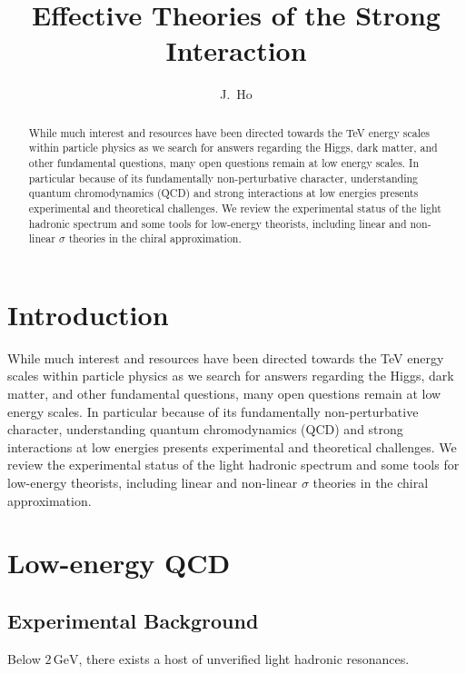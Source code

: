\documentclass[aps,prd,onecolumn,showpacs,amsmath,amssymb,nofootinbib]{revtex4} \pdfoutput=1
\begin{document}
\title{Effective Theories of the Strong Interaction}

\author{J.~Ho}

\begin{abstract}
While much interest and resources have been directed towards the TeV energy scales within particle physics as we search for answers regarding the Higgs, dark matter, and other fundamental questions, many open questions remain at low energy scales. In particular because of its fundamentally non-perturbative character, understanding quantum chromodynamics (QCD) and strong interactions at low energies presents experimental and theoretical challenges. We review the experimental status of the light hadronic spectrum and some tools for low-energy theorists, including linear and non-linear $\sigma$ theories in the chiral approximation.
\end{abstract}
\maketitle
\section{Introduction}\label{I}
While much interest and resources have been directed towards the TeV energy scales within particle physics as we search for answers regarding the Higgs, dark matter, and other fundamental questions, many open questions remain at low energy scales. In particular because of its fundamentally non-perturbative character, understanding quantum chromodynamics (QCD) and strong interactions at low energies presents experimental and theoretical challenges. We review the experimental status of the light hadronic spectrum and some tools for low-energy theorists, including linear and non-linear $\sigma$ theories in the chiral approximation.


\section{Low-energy QCD}\label{II}
\subsection{Experimental Background}
Below $2\,\mathrm{GeV}$, there exists a host of unverified light hadronic resonances. 
\end{document}
